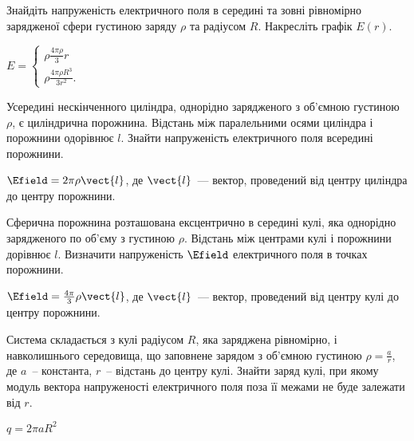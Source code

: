 \begin{problem}
    Знайдіть напруженість електричного поля в середині та зовні рівномірно зарядженої сфери густиною заряду $\rho$ та радіусом $R$. Накресліть графік $E(r)$.
\begin{solution}
	$E = 
		\begin{cases}
			\rho\frac{4\pi\rho}{3}r\\
			\rho\frac{4\pi\rho R^3}{3 r^2}.
		\end{cases}
	$
\end{solution}
\end{problem}

\begin{problem}
    Усередині нескінченного циліндра, однорідно зарядженого з об'ємною густиною $\rho$, є циліндрична порожнина. Відстань між паралельними осями циліндра і порожнини одорівнює $l$. Знайти напруженість електричного поля всередині порожнини.
\begin{solution}
	$\Efield = 2\pi\rho \vect{l}$, де $\vect{l}$~--- вектор, проведений від центру циліндра до центру порожнини.
\end{solution}
\end{problem}


\begin{problem}
Сферична порожнина розташована ексцентрично в середині кулі, яка однорідно зарядженого по об'єму з густиною
$\rho$. Відстань між центрами кулі і порожнини дорівнює $l$. Визначити напруженість $\Efield$ електричного поля в точках порожнини.
\begin{solution}
	$\Efield = \frac{4\pi}{3}\rho \vect{l}$, де $\vect{l}$~--- вектор, проведений від центру кулі до центру порожнини.
\end{solution}
\end{problem}

\begin{problem}
Система складається з кулі радіусом $R$, яка заряджена рівномірно, і навколишнього середовища, що заповнене зарядом з об'ємною густиною $\rho = \frac{a}{r}$, де $a$~-- константа, $r$~-- відстань до центру кулі. Знайти заряд кулі, при якому модуль вектора напруженості електричного поля поза її межами не буде залежати від $r$.
\begin{solution}
	$q = 2\pi a R^2$
\end{solution}
\end{problem}


